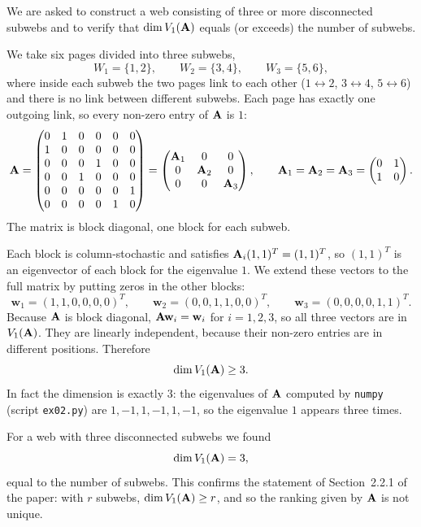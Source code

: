 

We are asked to construct a web consisting of three or more disconnected subwebs and to verify that $\dim V_1(\mathbf{A})$ equals (or exceeds) the number of subwebs.


We take six pages divided into three subwebs,
\[
  W_1 = \{1,2\}, \qquad W_2 = \{3,4\}, \qquad W_3 = \{5,6\},
\]
where inside each subweb the two pages link to each other ($1 \leftrightarrow 2$, $3 \leftrightarrow 4$, $5 \leftrightarrow 6$) and there is no link between different subwebs.
Each page has exactly one outgoing link, so every non-zero entry of $\mathbf{A}$ is $1$:
\[
  \mathbf{A} = \begin{pmatrix}
    0&1&0&0&0&0\\ 1&0&0&0&0&0\\ 0&0&0&1&0&0\\ 0&0&1&0&0&0\\ 0&0&0&0&0&1\\ 0&0&0&0&1&0
  \end{pmatrix}
  = \begin{pmatrix} \mathbf{A}_1 & 0 & 0\\ 0 & \mathbf{A}_2 & 0\\ 0 & 0 & \mathbf{A}_3 \end{pmatrix},
  \qquad
  \mathbf{A}_1 = \mathbf{A}_2 = \mathbf{A}_3 = \begin{pmatrix} 0&1\\1&0 \end{pmatrix}.
\]
The matrix is block diagonal, one block for each subweb.


Each block is column-stochastic and satisfies $\mathbf{A}_i (1,1)^T = (1,1)^T$, so $(1,1)^T$ is an eigenvector of each block for the eigenvalue $1$.
We extend these vectors to the full matrix by putting zeros in the other blocks:
\[
  \mathbf{w}_1 = (1,1,0,0,0,0)^T, \qquad
  \mathbf{w}_2 = (0,0,1,1,0,0)^T, \qquad
  \mathbf{w}_3 = (0,0,0,0,1,1)^T .
\]
Because $\mathbf{A}$ is block diagonal, $\mathbf{A}\mathbf{w}_i = \mathbf{w}_i$ for $i = 1,2,3$, so all three vectors are in $V_1(\mathbf{A})$.
They are linearly independent, because their non-zero entries are in different positions.
Therefore
\[
  \dim V_1(\mathbf{A}) \ge 3 .
\]
In fact the dimension is exactly $3$: the eigenvalues of $\mathbf{A}$ computed by \texttt{numpy} (script \texttt{ex02.py}) are $1,-1,1,-1,1,-1$, so the eigenvalue $1$ appears three times.


For a web with three disconnected subwebs we found
\[
  \dim V_1(\mathbf{A}) = 3 ,
\]
equal to the number of subwebs.
This confirms the statement of Section~2.2.1 of the paper: with $r$ subwebs, $\dim V_1(\mathbf{A}) \ge r$, and so the ranking given by $\mathbf{A}$ is not unique.
